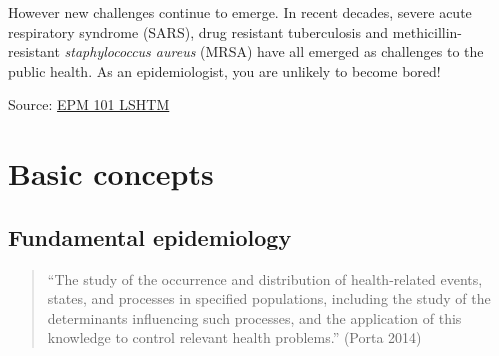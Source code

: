 \documentclass[
  letterpaper,
  DIV=11,
  numbers=noendperiod]{scrreprt}
\begin{document}
However new challenges continue to emerge. In recent decades, severe
acute respiratory syndrome (SARS), drug resistant tuberculosis and
methicillin-resistant \emph{staphylococcus aureus} (MRSA) have all
emerged as challenges to the public health. As an epidemiologist, you
are unlikely to become bored!

Source:
\href{https://www.lshtm.ac.uk/study/courses/masters-degrees/epidemiology-online\#overview}{EPM
101 LSHTM}

\part{Basic concepts}

\hypertarget{fundamental-epidemiology}{%
\chapter{Fundamental epidemiology}\label{fundamental-epidemiology}}

\begin{quote}
``The study of the occurrence and distribution of health-related events,
states, and processes in specified populations, including the study of
the determinants influencing such processes, and the application of this
knowledge to control relevant health problems.'' (Porta 2014)
\end{quote}
\end{document}
